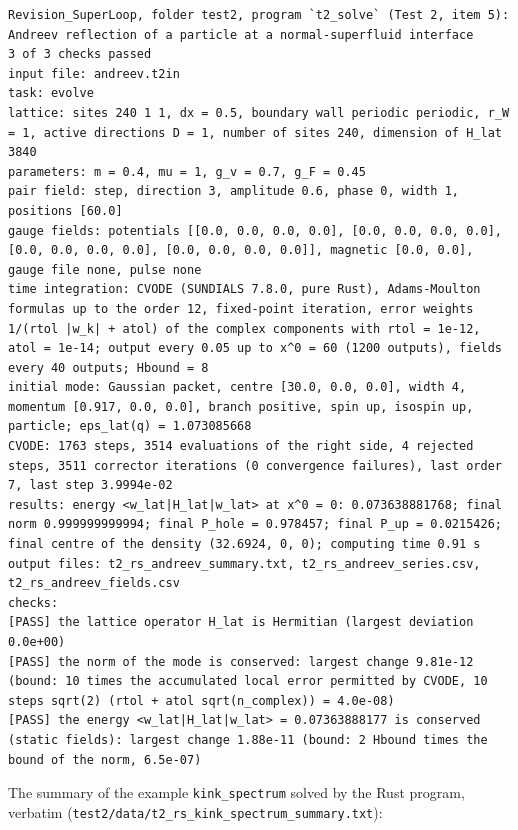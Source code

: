 \documentclass[
  10pt,
]{article}
\begin{document}
\begin{verbatim}
Revision_SuperLoop, folder test2, program `t2_solve` (Test 2, item 5): Andreev reflection of a particle at a normal-superfluid interface
3 of 3 checks passed
input file: andreev.t2in
task: evolve
lattice: sites 240 1 1, dx = 0.5, boundary wall periodic periodic, r_W = 1, active directions D = 1, number of sites 240, dimension of H_lat 3840
parameters: m = 0.4, mu = 1, g_v = 0.7, g_F = 0.45
pair field: step, direction 3, amplitude 0.6, phase 0, width 1, positions [60.0]
gauge fields: potentials [[0.0, 0.0, 0.0, 0.0], [0.0, 0.0, 0.0, 0.0], [0.0, 0.0, 0.0, 0.0], [0.0, 0.0, 0.0, 0.0]], magnetic [0.0, 0.0], gauge file none, pulse none
time integration: CVODE (SUNDIALS 7.8.0, pure Rust), Adams-Moulton formulas up to the order 12, fixed-point iteration, error weights 1/(rtol |w_k| + atol) of the complex components with rtol = 1e-12, atol = 1e-14; output every 0.05 up to x^0 = 60 (1200 outputs), fields every 40 outputs; Hbound = 8
initial mode: Gaussian packet, centre [30.0, 0.0, 0.0], width 4, momentum [0.917, 0.0, 0.0], branch positive, spin up, isospin up, particle; eps_lat(q) = 1.073085668
CVODE: 1763 steps, 3514 evaluations of the right side, 4 rejected steps, 3511 corrector iterations (0 convergence failures), last order 7, last step 3.9994e-02
results: energy <w_lat|H_lat|w_lat> at x^0 = 0: 0.073638881768; final norm 0.999999999994; final P_hole = 0.978457; final P_up = 0.0215426; final centre of the density (32.6924, 0, 0); computing time 0.91 s
output files: t2_rs_andreev_summary.txt, t2_rs_andreev_series.csv, t2_rs_andreev_fields.csv
checks:
[PASS] the lattice operator H_lat is Hermitian (largest deviation 0.0e+00)
[PASS] the norm of the mode is conserved: largest change 9.81e-12 (bound: 10 times the accumulated local error permitted by CVODE, 10 steps sqrt(2) (rtol + atol sqrt(n_complex)) = 4.0e-08)
[PASS] the energy <w_lat|H_lat|w_lat> = 0.07363888177 is conserved (static fields): largest change 1.88e-11 (bound: 2 Hbound times the bound of the norm, 6.5e-07)
\end{verbatim}

The summary of the example \texttt{kink\_spectrum} solved by the Rust
program, verbatim
(\texttt{test2/data/t2\_rs\_kink\_spectrum\_summary.txt}):
\end{document}
